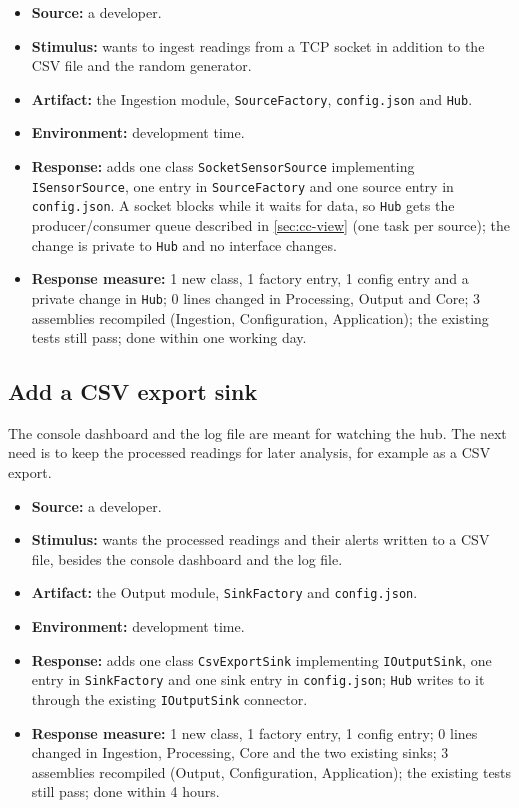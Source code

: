 \documentclass[../main-en.tex]{subfiles}
\begin{document}
\begin{itemize}
  \item \textbf{Source:} a developer.
  \item \textbf{Stimulus:} wants to ingest readings from a TCP socket in
  addition to the CSV file and the random generator.
  \item \textbf{Artifact:} the Ingestion module, \texttt{SourceFactory},
  \texttt{config.json} and \texttt{Hub}.
  \item \textbf{Environment:} development time.
  \item \textbf{Response:} adds one class \texttt{SocketSensorSource}
  implementing \texttt{ISensorSource}, one entry in \texttt{SourceFactory}
  and one source entry in \texttt{config.json}. A socket blocks while it
  waits for data, so \texttt{Hub} gets the producer/consumer queue described
  in \cref{sec:cc-view} (one task per source); the change is private to
  \texttt{Hub} and no interface changes.
  \item \textbf{Response measure:} 1 new class, 1 factory entry, 1 config
  entry and a private change in \texttt{Hub}; 0 lines changed in Processing,
  Output and Core; 3 assemblies recompiled (Ingestion, Configuration,
  Application); the existing tests still pass; done within one working day.
\end{itemize}

\subsection{Add a CSV export sink}
\label{sec:scenario-sink}

The console dashboard and the log file are meant for watching the hub. The
next need is to keep the processed readings for later analysis, for example
as a CSV export.

\begin{itemize}
  \item \textbf{Source:} a developer.
  \item \textbf{Stimulus:} wants the processed readings and their alerts
  written to a CSV file, besides the console dashboard and the log file.
  \item \textbf{Artifact:} the Output module, \texttt{SinkFactory} and
  \texttt{config.json}.
  \item \textbf{Environment:} development time.
  \item \textbf{Response:} adds one class \texttt{CsvExportSink}
  implementing \texttt{IOutputSink}, one entry in \texttt{SinkFactory} and
  one sink entry in \texttt{config.json}; \texttt{Hub} writes to it through
  the existing \texttt{IOutputSink} connector.
  \item \textbf{Response measure:} 1 new class, 1 factory entry, 1 config
  entry; 0 lines changed in Ingestion, Processing, Core and the two existing
  sinks; 3 assemblies recompiled (Output, Configuration, Application); the
  existing tests still pass; done within 4 hours.
\end{itemize}
\end{document}
